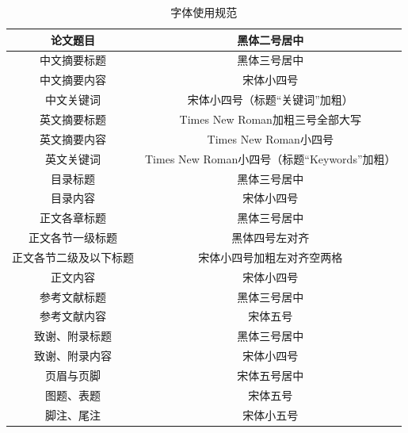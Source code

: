 \begin{table}[]
    \caption{字体使用规范}
    \begin{tabular}{|c|c|}
        \hline
        论文题目               & 黑体二号居中                                  \\ \hline
        中文摘要标题           & 黑体三号居中                                  \\ \hline
        中文摘要内容           & 宋体小四号                                    \\ \hline
        中文关键词             & 宋体小四号（标题``关键词''加粗）              \\ \hline
        英文摘要标题           & Times New Roman加粗三号全部大写               \\ \hline
        英文摘要内容           & Times New Roman小四号                         \\ \hline
        英文关键词             & Times New Roman小四号（标题``Keywords''加粗） \\ \hline
        目录标题               & 黑体三号居中                                  \\ \hline
        目录内容               & 宋体小四号                                    \\ \hline
        正文各章标题           & 黑体三号居中                                  \\ \hline
        正文各节一级标题       & 黑体四号左对齐                                \\ \hline
        正文各节二级及以下标题 & 宋体小四号加粗左对齐空两格                    \\ \hline
        正文内容               & 宋体小四号                                    \\ \hline
        参考文献标题           & 黑体三号居中                                  \\ \hline
        参考文献内容           & 宋体五号                                      \\ \hline
        致谢、附录标题         & 黑体三号居中                                  \\ \hline
        致谢、附录内容         & 宋体小四号                                    \\ \hline
        页眉与页脚             & 宋体五号居中                                  \\ \hline
        图题、表题             & 宋体五号                                      \\ \hline
        脚注、尾注             & 宋体小五号                                    \\ \hline
    \end{tabular}
    \label{tab:font-spec}
\end{table}


